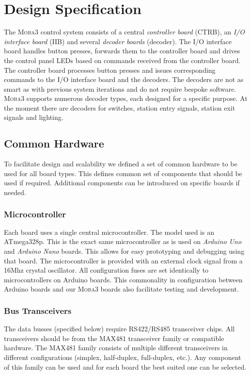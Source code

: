 \documentclass{scrreprt}
\begin{document}
\chapter{Design Specification}
The \textsc{Moba3} control system consists of a central \emph{controller board} (CTRB), an \emph{I/O interface board} (IIB) and several \emph{decoder boards} (decoder).
The I/O interface board handles button presses, forwards them to the controller board and drives the control panel LEDs based on commands received from the controller board.
The controller board processes button presses and issues corresponding commands to the I/O interface board and the decoders.
The decoders are not as smart as with previous system iterations and do not require bespoke software.
\textsc{Moba3} supports numerous decoder types, each designed for a specific purpose.
At the moment there are decoders for switches, station entry signals, station exit signals and lighting.

\section{Common Hardware}
To facilitate design and scalability we defined a set of common hardware to be used for all board types.
This defines common set of components that should be used if required.
Additional components can be introduced on specific boards if needed.

\subsection{Microcontroller}
Each board uses a single central microcontroller.
The model used is an ATmega328p.
This is the exact same microcontroller as is used on \emph{Arduino Uno} and \emph{Arduino Nano} boards.
This allows for easy prototyping and debugging using that board.
The microcontroller is provided with an external clock signal from a 16Mhz crystal oscillator.
All configuration fuses are set identically to microcontrollers on Arduino boards.
This commonality in configuration between Arduino boards and our \textsc{Moba3} boards also facilitate testing and development.

\subsection{Bus Transceivers}
The data busses (specified below) require RS422/RS485 transceiver chips.
All transceivers should be from the MAX481 transceiver family or compatible hardware.
The MAX481 family consists of multiple different transceivers in different configurations (simplex, half-duplex, full-duplex, etc.).
Any component of this family can be used and for each board the best suited one can be selected.
\end{document}
